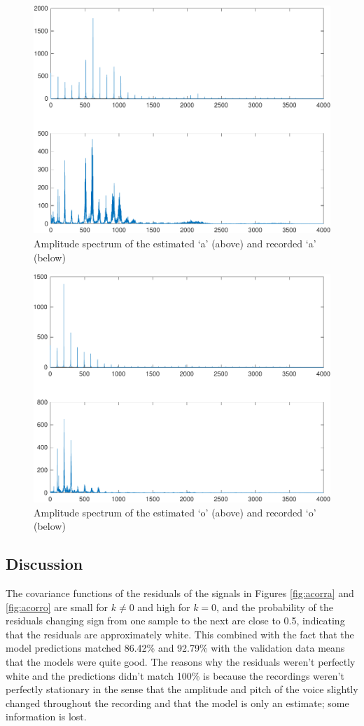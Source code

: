 \documentclass{IEEEtran}
\begin{document}
\begin{figure}[h!]
    \centering
    \captionsetup{justification=centering}
    \includegraphics[width=0.8\columnwidth]{pictures/apreddft.pdf}
    \caption{Amplitude spectrum of the estimated `a' (above) and recorded
    `a' (below)}
    \label{fig:adft}
\end{figure}

\begin{figure}[h!]
    \centering
    \captionsetup{justification=centering}
    \includegraphics[width=0.8\columnwidth]{pictures/opreddft.pdf}
    \caption{Amplitude spectrum of the estimated `o' (above) and recorded
    `o' (below)}
    \label{fig:odft}
\end{figure}

\subsection{Discussion}

The covariance functions of the residuals of the signals in Figures
\ref{fig:acorra} and \ref{fig:acorro} are small for $k \neq 0$ and
high for $k=0$, and the probability of the residuals changing sign from
one sample to the next are close to 0.5, indicating that the residuals are
approximately white. This combined with the fact that the model predictions
matched 86.42\% and 92.79\% with the validation data means that the models
were quite good. The reasons why the residuals weren't perfectly white and
the predictions didn't match 100\% is because the recordings weren't perfectly
stationary in the sense that the amplitude and pitch of the voice slightly
changed throughout the recording and that the model is only an estimate; some
information is lost.
\end{document}
